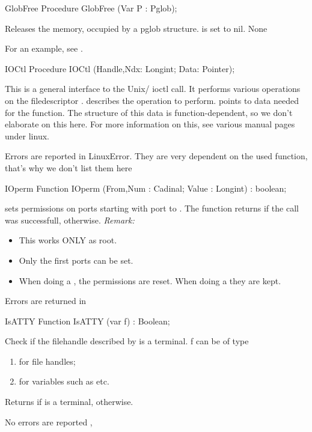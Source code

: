 \latex{}
\html{}
\begin{procedure}{GlobFree}
\Declaration
Procedure GlobFree (Var P : Pglob);

\Description
Releases the memory, occupied by a pglob structure.  is set to nil.
\Errors
None
\SeeAlso
\end{procedure}
For an example, see .
\begin{procedure}{IOCtl}
\Declaration
Procedure IOCtl (Handle,Ndx: Longint; Data: Pointer);

\Description

This is a general interface to the Unix/ \linux ioctl call.
It performs various operations on the filedescriptor .
 describes the operation to perform.
 points to data needed for the  function. 
The structure of this data is function-dependent, so we don't elaborate on
this here. 
For more information on this, see various manual pages under linux.

\Errors

Errors are reported in LinuxError. They are very dependent on the used
function, that's why we don't list them here

\SeeAlso
{}
\end{procedure}
\latex{}
\html{}
\begin{function}{IOperm}
\Declaration
Function IOperm (From,Num : Cadinal; Value : Longint) : boolean;

\Description
{}
  sets permissions on  ports starting with port  to 
  . The function returns  if the call was successfull,
   otherwise.
{\em Remark:}
\begin{itemize}
\item This works ONLY as root.
\item Only the first  ports can be set.
\item When doing a , the permissions are reset. When doing a
 they are kept.
\end{itemize}

\Errors
Errors are returned in 
\SeeAlso
{}
\end{function}
\begin{function}{IsATTY}
\Declaration
Function IsATTY (var f) : Boolean;

\Description

Check if the filehandle described by  is a terminal.
f can be of type
\begin{enumerate}
\item {} for file handles;
\item {} for  variables such as  etc.
\end{enumerate}
Returns  if  is a terminal,  otherwise.

\Errors
No errors are reported
\SeeAlso
{},
\end{function}

